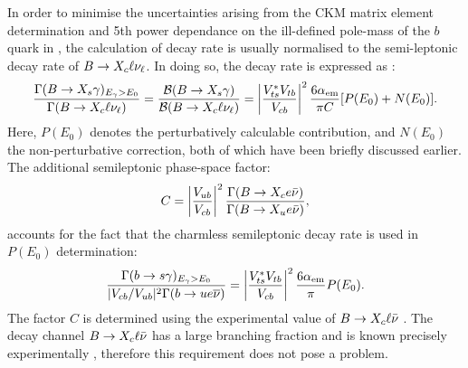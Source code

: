 In order to minimise the uncertainties arising from the CKM matrix element determination and 5th power dependance on the ill-defined pole-mass of the $b$ quark in , the calculation of \BtoXsgamma decay rate is usually normalised to the semi-leptonic decay rate of $B\rightarrow X_c\ell\nu_{\ell}$.
In doing so, the decay rate is expressed as \cite{Misiak:2020vlo}:
\begin{equation}\label{eq:normalised_br}
    \frac{\Gamma({B\rightarrow X_{s} \gamma})_{{E_{\gamma}}>E_0}}{\Gamma(B\rightarrow X_c\ell\nu_\ell)} = \frac{\mathcal{B}({B\rightarrow X_{s} \gamma})}{\mathcal{B}(B\rightarrow X_c\ell\nu_\ell)} = \left|\frac{V_{ts}^*V_{tb}}{V_{cb}}\right|^2\frac{6\alpha_{\mathrm{em}}}{\pi C}[P(E_0)+N(E_0)].
\end{equation}
Here, $P(E_0)$ denotes the perturbatively calculable contribution, and $N(E_0)$ the non-perturbative correction, both of which have been briefly discussed earlier.
The additional semileptonic phase-space factor:
\begin{equation}
    C = \left|\frac{V_{ub}}{V_{cb}}\right|^2 \frac{\Gamma(B\rightarrow X_ce\bar{\nu})}{\Gamma(B\rightarrow X_ue\bar{\nu})},
\end{equation}  
accounts for the fact that the charmless semileptonic decay rate is used in $P(E_0)$ determination:
\begin{equation}
    \frac{\Gamma(b\rightarrow s\gamma)_{{E_{\gamma}}>E_0}}{|V_{cb}/V_{ub}|^2 \Gamma(b\rightarrow u e\overline{\nu})} = \left|\frac{V_{ts}^*V_{tb}}{V_{cb}}\right|^2 \frac{6\alpha_{\mathrm{em}}}{\pi}P(E_0).
\end{equation}
The factor $C$ is determined using the experimental value of $B\rightarrow X_c \ell\bar{\nu}$ \cite{Alberti:2014yda}.
The decay channel $B\rightarrow X_c \ell\bar{\nu}$ has a large branching fraction and is known precisely experimentally \cite{Workman:2022ynf}, therefore this requirement does not pose a problem.

